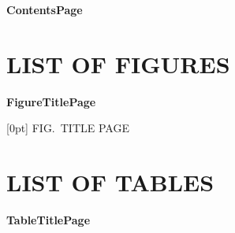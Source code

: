 
\vspace*{60pt}
\renewcommand{\contentsname}{\hfill\large\bfseries TABLE OF CONTENTS\hfill}
\vspace{-5ex}
\noindent\textbf{Contents}\hfill\textbf{Page}
\vspace*{-4cm}
\tableofcontents

\pagebreak

\newpage
\makeatletter
\chapter*{\large\bfseries\centering\vspace{15pt} LIST OF FIGURES}
\vspace{-4ex}
\noindent\textbf{Figure}\hfill\textbf{Title}\hfill\textbf{Page}
\vspace{-3ex}
\makeatother
\clearpage

\makeatletter
{}
[0pt]
{}
{\MakeUppercase{Fig.~\thecontentslabel\quad Title Page}\quad}
{}
{\contentspage}

\chapter*{\large\bfseries\centering\vspace{15pt} LIST OF TABLES}
\vspace{-4ex}
\noindent\textbf{Table}\hfill\textbf{Title}\hfill\textbf{Page}
\vspace{0.2cm}
\makeatother
\clearpage

